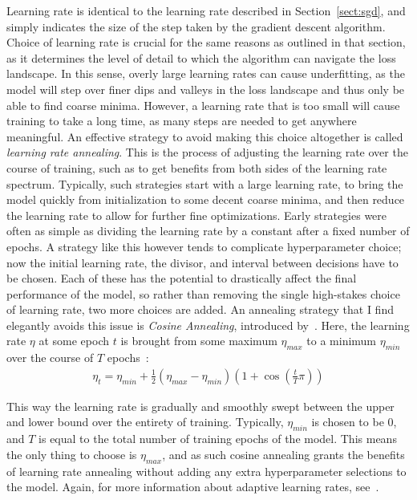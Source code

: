 Learning rate is identical to the learning rate described in Section~\ref{sect:sgd}, and simply indicates the size of the
step taken by the gradient descent algorithm. Choice of learning rate is crucial for the same reasons as outlined in that
section, as it determines the level of detail to which the algorithm can navigate the loss landscape. In this sense,
overly large learning rates can cause underfitting, as the model will step over finer dips and valleys in the loss
landscape and thus only be able to find coarse minima. However, a learning rate that is too small will cause training
to take a long time, as many steps are needed to get anywhere meaningful. An effective strategy to avoid making this choice
altogether is called \textit{learning rate annealing}. This
is the process of adjusting the learning rate over the course of training, such as to get benefits from both sides of the
learning rate spectrum. Typically, such strategies start with a large learning rate, to bring the model quickly from initialization
to some decent coarse minima, and then reduce the learning rate to allow for further fine optimizations. Early strategies
were often as simple as dividing the learning rate by a constant after a fixed number of epochs. A strategy like this
however tends to complicate hyperparameter choice; now the initial learning rate, the divisor, and interval between
decisions have to be chosen. Each of these has the potential to drastically affect the final performance of the model,
so rather than removing the single high-stakes choice of learning rate, two more choices are added. An annealing strategy that
I find elegantly avoids this issue is \textit{Cosine Annealing}, introduced by~\cite{loshchilov2016}.
Here, the learning rate $\eta$ at some epoch $t$ is brought from some maximum
$\eta_{max}$ to a minimum $\eta_{min}$ over the course of $T$ epochs~\citep{TorchSite}:
\begin{align}
	\eta_t = \eta_{min} + \frac{1}{2}(\eta_{max}-\eta_{min})\left(1+ \cos \left(\frac{t}{T} \pi \right)\right)
\end{align}

\noindent This way the learning rate is gradually and smoothly swept between the upper and lower bound over the entirety
of training. Typically, $\eta_{min}$ is chosen to be 0, and $T$ is equal to the total number of training epochs of the
model. This means the only thing to choose is $\eta_{max}$, and as such cosine annealing grants the benefits of learning
rate annealing without adding any extra hyperparameter selections to the model. Again, for more information about adaptive learning rates, see~\cite{goodfellow2016}.

